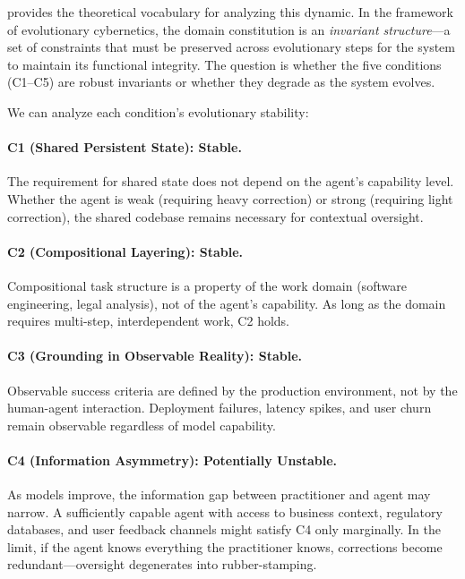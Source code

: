 \documentclass[11pt]{article}
\begin{document}
\citet{palagin2025evolutionary} provides the theoretical vocabulary for analyzing this dynamic.
In the framework of evolutionary cybernetics, the domain constitution is an \emph{invariant structure}---a set of constraints that must be preserved across evolutionary steps for the system to maintain its functional integrity.
The question is whether the five conditions (C1--C5) are robust invariants or whether they degrade as the system evolves.

We can analyze each condition's evolutionary stability:

\paragraph{C1 (Shared Persistent State): Stable.}
The requirement for shared state does not depend on the agent's capability level.
Whether the agent is weak (requiring heavy correction) or strong (requiring light correction), the shared codebase remains necessary for contextual oversight.

\paragraph{C2 (Compositional Layering): Stable.}
Compositional task structure is a property of the work domain (software engineering, legal analysis), not of the agent's capability.
As long as the domain requires multi-step, interdependent work, C2 holds.

\paragraph{C3 (Grounding in Observable Reality): Stable.}
Observable success criteria are defined by the production environment, not by the human-agent interaction.
Deployment failures, latency spikes, and user churn remain observable regardless of model capability.

\paragraph{C4 (Information Asymmetry): Potentially Unstable.}
As models improve, the information gap between practitioner and agent may narrow.
A sufficiently capable agent with access to business context, regulatory databases, and user feedback channels might satisfy C4 only marginally.
In the limit, if the agent knows everything the practitioner knows, corrections become redundant---oversight degenerates into rubber-stamping.
\end{document}
